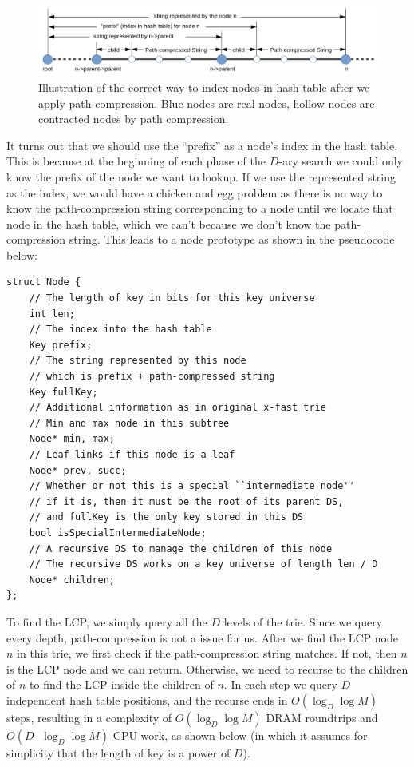 \documentclass[11pt, usletter]{article}
\begin{document}
\begin{figure}[!htb]
  \includegraphics[width=\linewidth]{mlpindex_node.png}
\caption{Illustration of the correct way to index nodes in hash table after we apply path-compression.
Blue nodes are real nodes, hollow nodes are contracted nodes by path compression.}
\label{mlpindex_node}
\end{figure}

It turns out that we should use the ``prefix'' as a node's index 
in the hash table. This is because at the beginning of each phase of the $D$-ary search
we could only know the prefix of the node we want to lookup. 
If we use the represented string as the index, we would have a chicken and egg problem as 
there is no way to know the path-compression string corresponding to a node
until we locate that node in the hash table, which we can't because we don't know the path-compression string. 
This leads to a node prototype as shown in the pseudocode below:

\singlespacing\begin{codebox}
\begin{verbatim}
struct Node {
    // The length of key in bits for this key universe
    int len;
    // The index into the hash table
    Key prefix;
    // The string represented by this node
    // which is prefix + path-compressed string
    Key fullKey;
    // Additional information as in original x-fast trie
    // Min and max node in this subtree
    Node* min, max;
    // Leaf-links if this node is a leaf
    Node* prev, succ;
    // Whether or not this is a special ``intermediate node''
    // if it is, then it must be the root of its parent DS,
    // and fullKey is the only key stored in this DS
    bool isSpecialIntermediateNode;
    // A recursive DS to manage the children of this node
    // The recursive DS works on a key universe of length len / D
    Node* children;
};
\end{verbatim}
\end{codebox}\doublespacing

To find the LCP, we simply query all the $D$ levels of the trie. 
Since we query every depth, path-compression is not a issue for us.
After we find the LCP node $n$ in this trie, we first check if the path-compression string matches. 
If not, then $n$ is the LCP node and we can return. Otherwise, 
we need to recurse to the children of $n$ to find the LCP inside the children of $n$. 
In each step we query $D$ independent hash table positions, and the recurse ends in $O(\log_D\log M)$ steps, 
resulting in a complexity of $O(\log_D\log M)$ DRAM roundtrips and $O(D\cdot\log_D\log M)$ CPU work,
as shown below (in which it assumes for simplicity that the length of key is a power of $D$).
\end{document}
